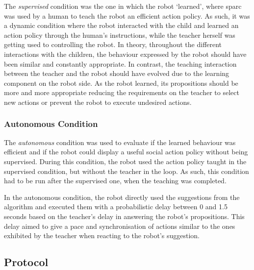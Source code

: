 The \textit{supervised} condition was the one in which the robot `learned', where \gls{sparc} was used by a human to teach the robot an efficient action policy. As such, it was a dynamic condition where the robot interacted with the child and learned an action policy through the human's instructions, while the teacher herself was getting used to controlling the robot. In theory, throughout the different interactions with the children, the behaviour expressed by the robot should have been similar and constantly appropriate. In contrast, the teaching interaction between the teacher and the robot should have evolved due to the learning component on the robot side. As the robot learned, its propositions should be more and more appropriate reducing the requirements on the teacher to select new actions or prevent the  robot to execute undesired actions.

\subsubsection{Autonomous Condition}

The \textit{autonomous} condition was used to evaluate if the learned behaviour was efficient and if the robot could display a useful social action policy without being supervised. During this condition, the robot used the action policy taught in the supervised condition, but without the teacher in the loop. As such, this condition had to be run after the supervised one, when the teaching was completed. %

In the autonomous condition, the robot directly used the suggestions from the algorithm and executed them with a probabilistic delay between 0 and 1.5 seconds based on the teacher's delay in answering the robot's propositions. This delay aimed to give a pace and synchronisation of actions similar to the ones exhibited by the teacher when reacting to the robot's suggestion.

\subsection{Protocol}

